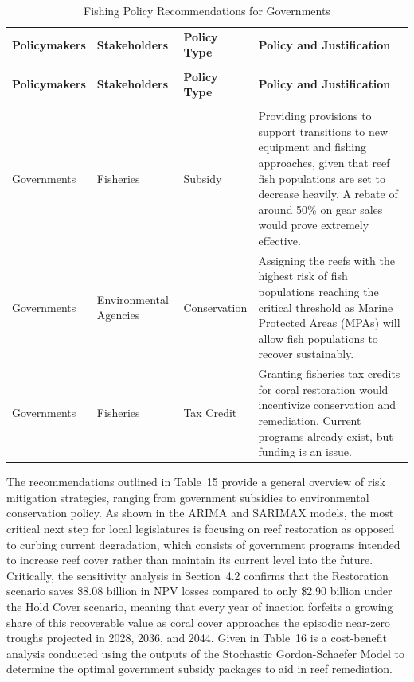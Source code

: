 \documentclass[10pt,letterpaper]{article}
\begin{document}
\begingroup
{}
\renewcommand{\arraystretch}{1.1}
\begin{xltabular}{\textwidth}{>{\centering\arraybackslash}p{2.2cm} 
                >{\centering\arraybackslash}p{2.4cm}
                >{\centering\arraybackslash}p{2.4cm}
                >{\centering\arraybackslash}X}
\caption{Fishing Policy Recommendations for Governments}
\label{tab:fishing-policy}\\
\toprule
{}\textbf{Policymakers} & \textbf{Stakeholders} & \textbf{Policy Type} & \textbf{Policy and Justification} \\
\midrule
\endfirsthead
{} \\[4pt]
\toprule
{}\textbf{Policymakers} & \textbf{Stakeholders} & \textbf{Policy Type} & \textbf{Policy and Justification} \\
\midrule
\endhead
\midrule
{} \\
\endfoot
\bottomrule
\endlastfoot
Governments & Fisheries & Subsidy & Providing provisions to support transitions to new equipment and fishing approaches, given that reef fish populations are set to decrease heavily. A rebate of around 50\% on gear sales would prove extremely effective. \\
Governments & Environmental Agencies & Conservation & Assigning the reefs with the highest risk of fish populations reaching the critical threshold as Marine Protected Areas (MPAs) will allow fish populations to recover sustainably. \\
Governments & Fisheries & Tax Credit & Granting fisheries tax credits for coral restoration would incentivize conservation and remediation. Current programs already exist, but funding is an issue. \\
\end{xltabular}
\endgroup

The recommendations outlined in Table~15 provide a general overview of risk mitigation strategies,
ranging from government subsidies to environmental conservation policy. As shown in the ARIMA and
SARIMAX models, the most critical next step for local legislatures is focusing on reef restoration as
opposed to curbing current degradation, which consists of government programs intended to increase
reef cover rather than maintain its current level into the future. Critically, the sensitivity analysis
in Section~4.2 confirms that the Restoration scenario saves \$8.08 billion in NPV losses compared to
only \$2.90 billion under the Hold Cover scenario, meaning that every year of inaction forfeits a
growing share of this recoverable value as coral cover approaches the episodic near-zero troughs
projected in 2028, 2036, and 2044. Given in Table~16 is a cost-benefit analysis conducted using the
outputs of the Stochastic Gordon-Schaefer Model to determine the optimal government subsidy packages
to aid in reef remediation.
\end{document}
